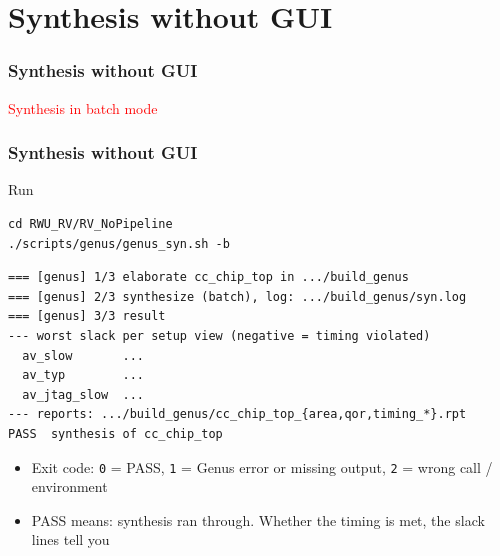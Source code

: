 \documentclass{beamer}
\newcommand{\astitle}{nix}
\newcommand{\assubtitle}{nix}
\newcommand{\cmd}[1]{\texttt{#1}}
\begin{document}
\section{Synthesis without GUI}
\renewcommand{\astitle}{Synthesis without GUI}
\begin{frame}
\frametitle{\astitle}
\textcolor{red}{Synthesis in batch mode}
\end{frame}

\renewcommand{\assubtitle}{Run}
\begin{frame}[fragile]
\frametitle{\astitle}
\begin{block}{\assubtitle}
\begin{lstlisting}[style=sh,basicstyle=\ttfamily\small]
cd RWU_RV/RV_NoPipeline
./scripts/genus/genus_syn.sh -b
\end{lstlisting}
\begin{lstlisting}
=== [genus] 1/3 elaborate cc_chip_top in .../build_genus
=== [genus] 2/3 synthesize (batch), log: .../build_genus/syn.log
=== [genus] 3/3 result
--- worst slack per setup view (negative = timing violated)
  av_slow       ...
  av_typ        ...
  av_jtag_slow  ...
--- reports: .../build_genus/cc_chip_top_{area,qor,timing_*}.rpt
PASS  synthesis of cc_chip_top
\end{lstlisting}
  \begin{itemize}
    \item Exit code: \cmd{0} = PASS, \cmd{1} = Genus error or missing output,
      \cmd{2} = wrong call / environment
    \item PASS means: synthesis ran through. Whether the timing is met,
      the slack lines tell you
  \end{itemize}
\end{block}
\end{frame}
\end{document}
